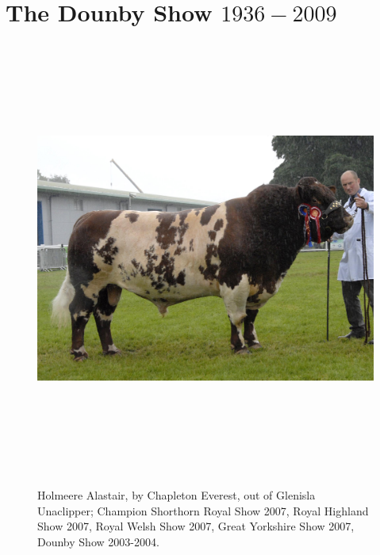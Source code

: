 \part[The Dounby Show]{The Dounby Show $1936-2009$}

\begin{figure}
\begin{center}
	\includegraphics[width=196.70mm,height=143.49mm]{Images/Highland_Beef_SH_2007.jpg} \\
	\caption[Holmeere Alastair, Champion Shorthorn, Dounby show 2003 - 2004.]{Holmeere Alastair, by Chapleton Everest, out of Glenisla Unaclipper; Champion Shorthorn Royal Show 2007, Royal Highland Show 2007, Royal Welsh Show 2007, Great Yorkshire Show 2007, Dounby Show 2003-2004.}
\end{center}
\end{figure}


